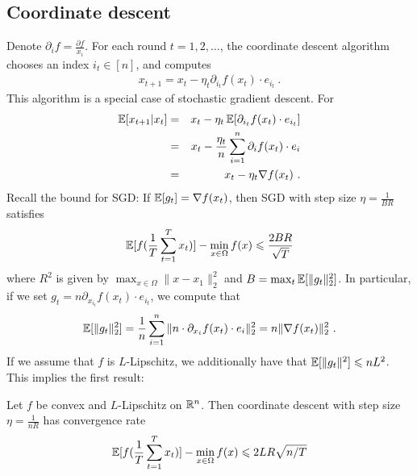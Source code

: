 \subsection{Coordinate descent}
  Denote $\partial_i f= \frac{\partial f}{x_i}$.
  For each round $t = 1,2,\dots$, the coordinate descent algorithm
  chooses an index $i_t \in [n]$, and computes
	\begin{eqnarray}
	x_{t+1} = x_t - \eta_t\partial_{i_t}f(x_t) \cdot e_{i_t} \ .
	\end{eqnarray}
  This algorithm is a special case of stochastic gradient descent. For
	\begin{eqnarray}
    \operatorname*{\mathbb{E}}[x_{t+1} | x_t]
    &=& x_t - \eta_t \operatorname*{\mathbb{E}} [\partial_{i_t}f(x_t) \cdot e_{i_t}] \\
    &=& x_t - \frac{\eta_t}{n} \sum_{i=1}^n \partial_{i}f(x_t) \cdot e_i \\
    &=& x_t - \eta_t \nabla f(x_t) \ .
	\end{eqnarray}
	Recall the bound for SGD: If $\operatorname*{\mathbb{E}}[g_t] = \nabla f(x_t)$, then SGD with step size $\eta = \frac{1}{BR}$ satisfies
	\begin{eqnarray}
	\operatorname*{\mathbb{E}}[f(\frac{1}{T}\sum_{t=1}^T x_t)] - \min_{x \in \Omega}f(x) \leqslant \frac{2 BR}{\sqrt{T}}
	\end{eqnarray}
	where $R^2$ is given by $\max_{x \in \Omega} \|x-x_1\|^2_2$ and $B = \max_{t}\operatorname*{\mathbb{E}}[\|g_t\|^2_2]$. In particular, if we set $g_t = n \partial_{x_{i_t}}f(x_t) \cdot e_{i_t}$, we compute that
	\begin{eqnarray}
    \operatorname*{\mathbb{E}}[\|g_t\|^2_2]
    = \frac{1}{n} \sum_{i=1}^n \|n\cdot \partial_{x_{i}}f(x_t) \cdot e_i\|^2_2
    = n \|\nabla f(x_t)\|^2_2 \ .
	\end{eqnarray}
	If we assume that $f$ is $L$-Lipschitz, we additionally have that 
	$\operatorname*{\mathbb{E}}[\|g_t\|^2] \leqslant nL^2$.
  This implies the first result:
	\begin{proposition} Let $f$ be convex and $L$-Lipschitz on $\mathbb{R}^n$.
    Then coordinate descent with step size $\eta = \frac{1}{n R}$ has convergence rate 
	\begin{eqnarray}
	\operatorname*{\mathbb{E}}[f(\frac{1}{T}\sum_{t=1}^T x_t)] - \min_{x \in \Omega}f(x) \leqslant 2LR\sqrt{n/T}
	\end{eqnarray}
	\end{proposition}
